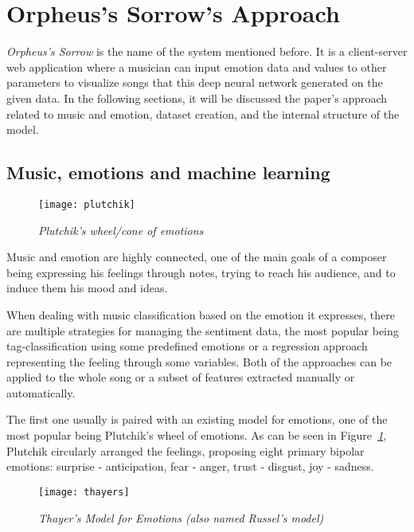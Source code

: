 \section{Orpheus's Sorrow's Approach}
\emph{Orpheus's Sorrow} is the name of the system mentioned before.
It is a client-server web application where a musician can input
emotion data and values to other parameters to visualize songs that this deep
neural network generated on the given data.
In the following sections,
it will be discussed the paper's approach related to music and emotion,
dataset creation, and the internal structure of the model.


\subsection{Music, emotions and machine learning}
\begin{figure}[h]
  \centering
  \texttt{[image: plutchik]}
  \caption{\emph{Plutchik's wheel/cone of emotions \cite{plutchik}}}
  \label{fig:plutchik}
\end{figure}
Music and emotion are highly connected,
one of the main goals of a composer being expressing his feelings through notes,
trying to reach his audience, and to induce them his mood and ideas.


When dealing with music classification based on the emotion it expresses,
there are multiple strategies for managing the sentiment data,
the most popular being tag-classification using some predefined emotions
or a regression approach representing the feeling through some variables.
Both of the approaches can be applied to the whole song or a subset of
features extracted manually or automatically.


The first one usually is paired with an existing model for emotions,
one of the most popular being Plutchik's wheel of emotions.
As can be seen in Figure\emph{~\ref{fig:plutchik}},
Plutchik circularly arranged the feelings,
proposing eight primary bipolar emotions:
surprise - anticipation, fear - anger, trust - disgust, joy - sadness.


\begin{wrapfigure}[10]{r}{0.5\textwidth}
  \centering
  \texttt{[image: thayers]}
  \caption{\emph{Thayer's Model for Emotions (also named Russel's model) \cite{plutchik}}}
  \label{fig:thayers}
\end{wrapfigure}

